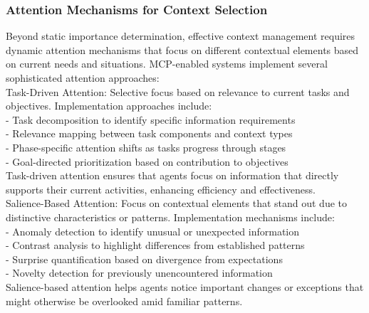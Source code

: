 \subsubsection{Attention Mechanisms for Context Selection}
Beyond static importance determination, effective context management requires dynamic attention mechanisms that focus on different contextual elements based on current needs and situations. MCP-enabled systems implement several sophisticated attention approaches:\\ \newline
Task-Driven Attention: Selective focus based on relevance to current tasks and objectives. Implementation approaches include:\\ \newline
- Task decomposition to identify specific information requirements\\ \newline
- Relevance mapping between task components and context types\\ \newline
- Phase-specific attention shifts as tasks progress through stages\\ \newline
- Goal-directed prioritization based on contribution to objectives\\ \newline
Task-driven attention ensures that agents focus on information that directly supports their current activities, enhancing efficiency and effectiveness.\\ \newline
Salience-Based Attention: Focus on contextual elements that stand out due to distinctive characteristics or patterns. Implementation mechanisms include:\\ \newline
- Anomaly detection to identify unusual or unexpected information\\ \newline
- Contrast analysis to highlight differences from established patterns\\ \newline
- Surprise quantification based on divergence from expectations\\ \newline
- Novelty detection for previously unencountered information\\ \newline
Salience-based attention helps agents notice important changes or exceptions that might otherwise be overlooked amid familiar patterns.\\ \newline
